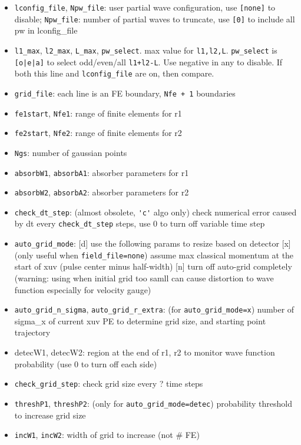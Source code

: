 
\begin{itemize}
\item \verb`lconfig_file`, \verb`Npw_file`: user partial wave configuration, use \verb`[none]` to disable; \verb`Npw_file`: number of partial waves to truncate, use \verb`[0]` to include all pw in lconfig_file
\item \verb`l1_max`, \verb`l2_max`, \verb`L_max`, \verb`pw_select`. max value for \verb`l1,l2,L`. \verb`pw_select` is \verb`[o|e|a]` to select odd/even/all \verb`l1+l2-L`. Use negative in any to disable. If both this line and \verb`lconfig_file` are on, then compare.
\item \verb`grid_file`: each line is an FE boundary, \verb`Nfe + 1` boundaries
\item \verb`fe1start`, \verb`Nfe1`: range of finite elements for r1
\item \verb`fe2start`, \verb`Nfe2`: range of finite elements for r2
\item \verb`Ngs`: number of gaussian points
\item \verb`absorbW1`, \verb`absorbA1`: absorber parameters for r1
\item \verb`absorbW2`, \verb`absorbA2`: absorber parameters for r2
\item \verb`check_dt_step`: (almost obsolete, \verb`'c'` algo only) check numerical error caused by dt every \verb`check_dt_step` steps, use 0 to turn off variable time step
\item \verb`auto_grid_mode`: [d] use the following params to resize based on detector [x] (only useful when \verb`field_file=none`) assume max classical momentum at the start of xuv (pulse center minus half-width) [n] turn off auto-grid completely (warning: using when initial grid too samll can cause distortion to wave function especially for velocity gauge)
\item \verb`auto_grid_n_sigma`, \verb`auto_grid_r_extra`: (for \verb`auto_grid_mode=x`) number of sigma_x of current xuv PE to determine grid size, and starting point trajectory
\item detecW1, detecW2: region at the end of r1, r2 to monitor wave function probability (use 0 to turn off each side)
\item \verb`check_grid_step`: check grid size every ? time steps
\item \verb`threshP1`, \verb`threshP2`: (only for \verb`auto_grid_mode=detec`) probability threshold to increase grid size
\item \verb`incW1`, \verb`incW2`: width of grid to increase (not # FE)

\end{itemize}
